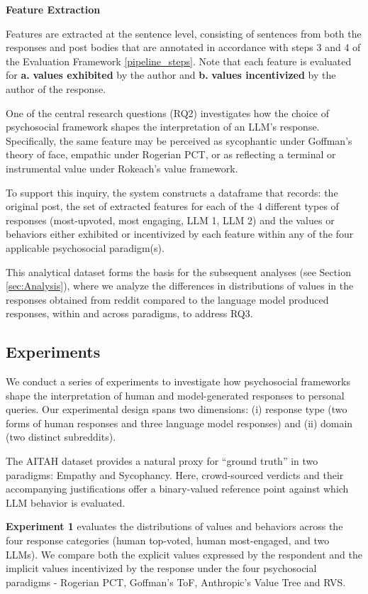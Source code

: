 \medskip 
\textbf{Feature Extraction}

\smallskip Features are extracted at the sentence level, consisting of sentences from both the responses and post bodies that are annotated in accordance with steps 3 and 4 of the Evaluation Framework \ref{pipeline_steps}. Note that each feature is evaluated for \textbf{a.} \textbf{values exhibited} by the author and \textbf{b.} \textbf{values incentivized} by the author of the response. 


One of the central research questions (RQ2) investigates how the choice of psychosocial framework shapes the interpretation of an LLM’s response. Specifically, the same feature may be perceived as sycophantic under Goffman’s theory of face, empathic under Rogerian PCT, or as reflecting a terminal or instrumental value under Rokeach’s value framework.

To support this inquiry, the system constructs a dataframe that records: the original post, the set of extracted features for each of the 4 different types of responses (most-upvoted, most engaging, LLM 1, LLM 2) and the values or behaviors either exhibited or incentivized by each feature within any of the four applicable psychosocial paradigm(s).

This analytical dataset forms the basis for the subsequent analyses (see Section \ref{sec:Analysis}), where we analyze the differences in distributions of values in the responses obtained from reddit compared to the language model produced responses, within and across paradigms, to address RQ3.

\subsection{Experiments}
We conduct a series of experiments to investigate how psychosocial frameworks shape the interpretation of human and model-generated responses to personal queries. Our experimental design spans two dimensions: (i) response type (two forms of human responses and three language model responses) and (ii) domain (two distinct subreddits).

The AITAH dataset provides a natural proxy for “ground truth” in two paradigms: Empathy and Sycophancy. Here, crowd-sourced verdicts and their accompanying justifications offer a binary-valued reference point against which LLM behavior is evaluated.

\textbf{Experiment 1} evaluates the distributions of values and behaviors across the four response categories (human top-voted, human most-engaged, and two LLMs). We compare both the explicit values expressed by the respondent and the implicit values incentivized by the response under the four psychosocial paradigms - Rogerian PCT, Goffman’s ToF, Anthropic’s Value Tree and RVS.


